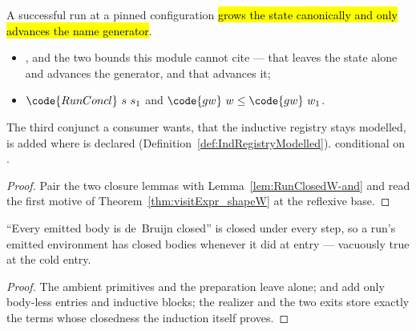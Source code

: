 \begin{theorem}
\label{thm:visitExpr_runConcl_gen}
\leanok
{}
 A successful  run at a pinned configuration \hl{grows the state
canonically and only advances the name generator}.
\begin{itemize}
\item {} , and the two bounds this module cannot cite --- that
 leaves the state alone and advances the generator, and that
 advances it;
\item {} $\code{RunConcl}\ s\ s_1$ and $\code{gw}\ w \le \code{gw}\ w_1$.
\end{itemize}
 The third conjunct a consumer wants, that the inductive registry stays modelled, is added
where  is declared (Definition~\ref{def:IndRegistryModelled}).
 \stProved{} conditional on \stAssumed{} .
\end{theorem}
\begin{proof}
\leanok
{}
 Pair the two closure lemmas with Lemma~\ref{lem:RunClosedW-and} and read the first motive
of Theorem~\ref{thm:visitExpr_shapeW} at the reflexive base.
\end{proof}
\begin{lemma}
\label{lem:runClosedW_closedBodies}
\leanok
{}
 ``Every emitted body is de~Bruijn closed'' is closed under every step, so a
 run's emitted environment has closed bodies whenever it did at entry --- vacuously true
at the cold entry.
\end{lemma}
\begin{proof}
\leanok
{}
 The ambient primitives and the preparation leave  alone;  and
 add only body-less entries and inductive blocks; the realizer and the two
 exits store exactly the terms whose closedness the induction itself proves.
\end{proof}


